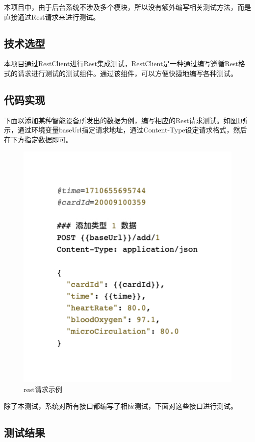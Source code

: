 \documentclass[oneside]{xduugthesis}
\begin{document}
本项目中，由于后台系统不涉及多个模块，所以没有额外编写相关测试方法，而是直接通过Rest请求来进行测试。

\subsection{技术选型}

本项目通过RestClient进行Rest集成测试，RestClient是一种通过编写遵循Rest格式的请求进行测试的测试组件。通过该组件，可以方便快捷地编写各种测试。

\subsection{代码实现}

下面以添加某种智能设备所发出的数据为例，编写相应的Rest请求测试。如图\ref{fig:rest}所示，通过环境变量baseUrl指定请求地址，通过Content-Type设定请求格式，然后在下方指定数据即可。

\begin{figure}[htb]
    \centering
    \includegraphics[width=0.8\linewidth]{images/code-rest.jpeg}
    \caption{rest请求示例}
    \label{fig:rest}
\end{figure}

除了本测试，系统对所有接口都编写了相应测试，下面对这些接口进行测试。

\subsection{测试结果}
\end{document}
